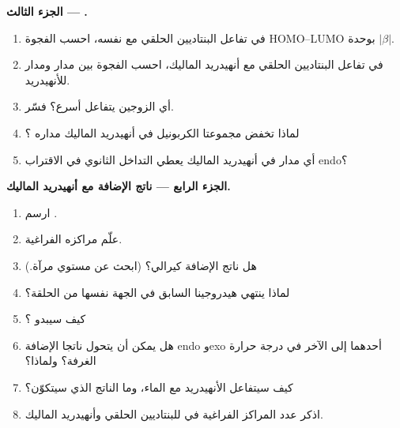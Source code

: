 \begin{problem}
\medskip
\noindent\textbf{الجزء الثالث --- .}
\begin{enumerate}[resume]
  \item في تفاعل البنتاديين الحلقي مع نفسه، احسب الفجوة HOMO--LUMO بوحدة
        $|\beta|$.
  \item في تفاعل البنتاديين الحلقي مع أنهيدريد الماليك، احسب الفجوة بين مدار 
         ومدار  للأنهيدريد.
  \item أي الزوجين يتفاعل أسرع؟ فسّر.
  \item لماذا تخفض مجموعتا الكربونيل في أنهيدريد الماليك مداره ؟
  \item أي مدار في أنهيدريد الماليك يعطي التداخل الثانوي في الاقتراب
        endo؟
\end{enumerate}

\medskip
\noindent\textbf{الجزء الرابع --- ناتج الإضافة مع أنهيدريد الماليك.}
\begin{enumerate}[resume]
  \item ارسم .
  \item علّم مراكزه الفراغية.
  \item هل ناتج الإضافة كيرالي؟ (ابحث عن مستوي مرآة.)
  \item لماذا ينتهي هيدروجينا  السابق في الجهة نفسها من
        الحلقة؟
  \item كيف سيبدو ؟
  \item هل يمكن أن يتحول ناتجا الإضافة endo وexo أحدهما إلى الآخر في درجة حرارة الغرفة؟ ولماذا؟
  \item كيف سيتفاعل الأنهيدريد مع الماء، وما الناتج الذي سيتكوّن؟
  \item اذكر عدد المراكز الفراغية في  للبنتاديين الحلقي 
        وأنهيدريد الماليك.
\end{enumerate}
\end{problem}
